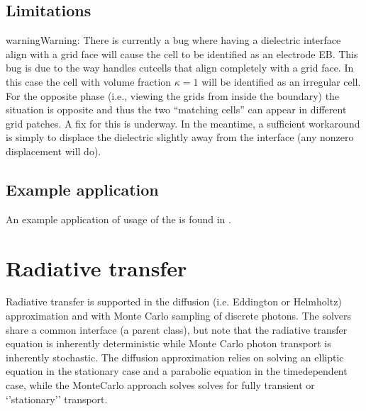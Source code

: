 \documentclass[letterpaper,10pt,english]{sphinxmanual}
\begin{document}
\subsection{Limitations}
\label{\detokenize{Solvers/Electrostatics:limitations}}
\begin{sphinxadmonition}{warning}{Warning:}
There is currently a bug where having a dielectric interface align  with a grid face will cause the cell to be identified as an electrode EB.
This bug is due to the way  handles cut\sphinxhyphen{}cells that align completely with a grid face.
In this case the cell with volume fraction \(\kappa = 1\) will be identified as an irregular cell.
For the opposite phase (i.e., viewing the grids from inside the boundary) the situation is opposite and thus the two “matching cells” can appear in different grid patches.
A fix for this is underway.
In the meantime, a sufficient workaround is simply to displace the dielectric slightly away from the interface (any non\sphinxhyphen{}zero displacement will do).
\end{sphinxadmonition}


\subsection{Example application}
\label{\detokenize{Solvers/Electrostatics:example-application}}
An example application of usage of the  is found in {\hyperref[\detokenize{Applications/ElectrostaticsModel:chap-electrostaticsmodel}]{}}.


\section{Radiative transfer}
\label{\detokenize{Solvers/RTE:radiative-transfer}}\label{\detokenize{Solvers/RTE:chap-radiativetransfer}}\label{\detokenize{Solvers/RTE::doc}}
Radiative transfer is supported in the diffusion (i.e. Eddington or Helmholtz) approximation and with Monte Carlo sampling of discrete photons.
The solvers share a common interface (a parent class), but note that the radiative transfer equation is inherently deterministic while Monte Carlo photon transport is inherently stochastic.
The diffusion approximation relies on solving an elliptic equation in the stationary case and a parabolic equation in the time\sphinxhyphen{}dependent case, while the Monte\sphinxhyphen{}Carlo approach solves solves for fully transient or ‘’stationary’’ transport.
\end{document}
